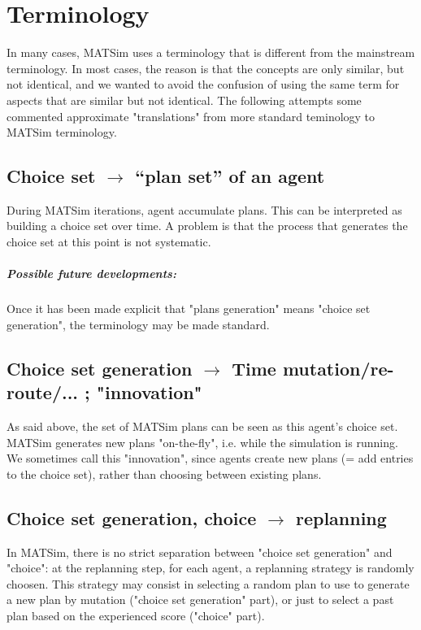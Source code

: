\chapter{Terminology}


\bigskip

In  many cases, MATSim uses a terminology that is different from the  mainstream terminology. In most cases, the reason is that the  concepts are only similar, but not identical, and we wanted to avoid the  confusion of using the same term for aspects that are similar but not  identical. The following attempts some commented approximate  "translations" from more standard teminology to MATSim terminology.

\section{Choice set $\to$ ``plan set'' of an agent}

During MATSim iterations, agent accumulate   plans. This can be  interpreted as building a choice set over  time. A  problem is that the  process that generates the choice  set at this  point is not systematic.

\paragraph{Possible future developments:} Once it has been made explicit that "plans generation" means "choice set generation", the terminology may be made standard.

\section{Choice set generation $\to$ Time mutation/re-route/... ; "innovation"}

As said above, the set of MATSim plans can   be seen as this agent's choice set. MATSim generates new plans   "on-the-fly", i.e. while the simulation is running. We sometimes  call  this "innovation", since agents create new plans (= add entries to  the  choice set), rather than choosing between existing plans.

\section{Choice set generation, choice $\to$ replanning}

In MATSim, there is no strict separation between "choice set  generation" and "choice": at the replanning step, for each agent, a  replanning strategy is randomly choosen. This strategy may consist in  selecting a random plan to use to generate a new plan by mutation  ("choice set generation" part), or just to select a past plan based on  the experienced score ("choice" part).

